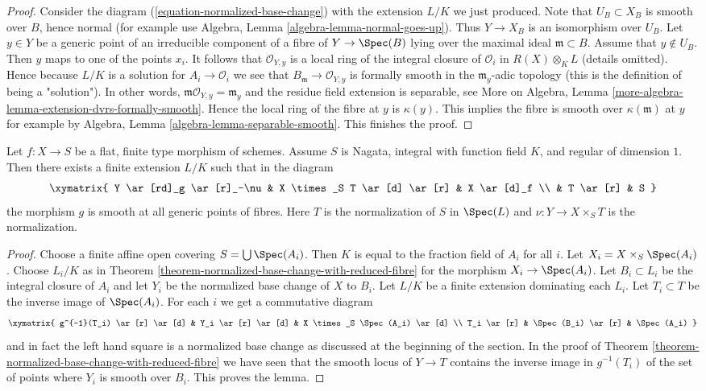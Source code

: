 \begin{proof}
\medskip\noindent
Consider the diagram (\ref{equation-normalized-base-change})
with the extension $L/K$ we just produced. Note that $U_B \subset X_B$
is smooth over $B$, hence normal (for example use
Algebra, Lemma \ref{algebra-lemma-normal-goes-up}).
Thus $Y \to X_B$ is an isomorphism over $U_B$.
Let $y \in Y$ be a generic point of an irreducible
component of a fibre of $Y \to \Spec(B)$ lying over the maximal
ideal $\mathfrak m \subset B$. Assume that $y \not \in U_B$.
Then $y$ maps to one of the points $x_i$. It follows that
$\mathcal{O}_{Y, y}$ is a local ring of the integral closure
of $\mathcal{O}_i$ in $R(X) \otimes_K L$ (details omitted).
Hence because $L/K$ is a solution for
$A_i \to \mathcal{O}_i$ we see that
$B_\mathfrak m \to \mathcal{O}_{Y, y}$ is formally smooth
in the $\mathfrak m_y$-adic topology
(this is the definition of being a "solution").
In other words, $\mathfrak m\mathcal{O}_{Y, y} = \mathfrak m_y$
and the residue field extension is separable, see
More on Algebra, Lemma \ref{more-algebra-lemma-extension-dvrs-formally-smooth}.
Hence the local ring
of the fibre at $y$ is $\kappa(y)$.
This implies the fibre is smooth over $\kappa(\mathfrak m)$
at $y$ for example by Algebra, Lemma \ref{algebra-lemma-separable-smooth}.
This finishes the proof.
\end{proof}

\begin{lemma}
\label{lemma-normalized-base-change-with-reduced-fibre-over-curve}
Let $f : X \to S$ be a flat, finite type morphism of schemes.
Assume $S$ is Nagata, integral with function field $K$, and
regular of dimension $1$. Then there exists a finite extension $L/K$
such that in the diagram
$$
\xymatrix{
Y \ar[rd]_g \ar[r]_-\nu & X \times_S T \ar[d] \ar[r] & X \ar[d]_f \\
& T \ar[r] & S
}
$$
the morphism $g$ is smooth at all generic points of fibres. Here
$T$ is the normalization of $S$ in $\Spec(L)$ and $\nu : Y \to X \times_S T$
is the normalization.
\end{lemma}

\begin{proof}
Choose a finite affine open covering $S = \bigcup \Spec(A_i)$.
Then $K$ is equal to the fraction field of $A_i$ for all $i$.
Let $X_i = X \times_S \Spec(A_i)$.
Choose $L_i/K$ as in
Theorem \ref{theorem-normalized-base-change-with-reduced-fibre}
for the morphism $X_i \to \Spec(A_i)$.
Let $B_i \subset L_i$ be the integral closure of $A_i$ and
let $Y_i$ be the normalized base change of $X$ to $B_i$.
Let $L/K$ be a finite extension dominating each $L_i$.
Let $T_i \subset T$ be the inverse image of $\Spec(A_i)$.
For each $i$ we get a commutative diagram
$$
\xymatrix{
g^{-1}(T_i) \ar[r] \ar[d] & Y_i \ar[r] \ar[d] & X \times_S \Spec(A_i) \ar[d] \\
T_i \ar[r] & \Spec(B_i) \ar[r] & \Spec(A_i)
}
$$
and in fact the left hand square is a normalized base change
as discussed at the beginning of the section. In the proof
of Theorem \ref{theorem-normalized-base-change-with-reduced-fibre}
we have seen that the smooth locus of $Y \to T$ contains the
inverse image in $g^{-1}(T_i)$ of the set of points
where $Y_i$ is smooth over $B_i$. This proves the lemma.
\end{proof}

